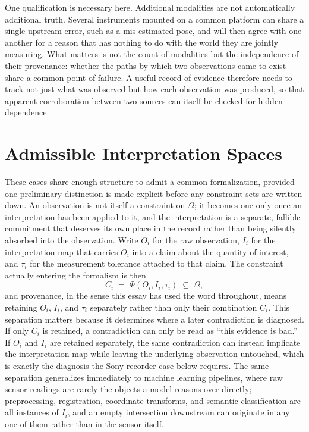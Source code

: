 \documentclass[11pt]{article}
\begin{document}
One qualification is necessary here. Additional modalities are not automatically additional truth. Several instruments mounted on a common platform can share a single upstream error, such as a mis-estimated pose, and will then agree with one another for a reason that has nothing to do with the world they are jointly measuring. What matters is not the count of modalities but the independence of their provenance: whether the paths by which two observations came to exist share a common point of failure. A useful record of evidence therefore needs to track not just what was observed but how each observation was produced, so that apparent corroboration between two sources can itself be checked for hidden dependence.

\section{Admissible Interpretation Spaces}

These cases share enough structure to admit a common formalization, provided one preliminary distinction is made explicit before any constraint sets are written down. An observation is not itself a constraint on $\Omega$; it becomes one only once an interpretation has been applied to it, and the interpretation is a separate, fallible commitment that deserves its own place in the record rather than being silently absorbed into the observation. Write $O_i$ for the raw observation, $I_i$ for the interpretation map that carries $O_i$ into a claim about the quantity of interest, and $\tau_i$ for the measurement tolerance attached to that claim. The constraint actually entering the formalism is then
\[
C_i \;=\; \Phi(O_i, I_i, \tau_i) \;\subseteq\; \Omega,
\]
and provenance, in the sense this essay has used the word throughout, means retaining $O_i$, $I_i$, and $\tau_i$ separately rather than only their combination $C_i$. This separation matters because it determines where a later contradiction is diagnosed. If only $C_i$ is retained, a contradiction can only be read as ``this evidence is bad.'' If $O_i$ and $I_i$ are retained separately, the same contradiction can instead implicate the interpretation map while leaving the underlying observation untouched, which is exactly the diagnosis the Sony recorder case below requires. The same separation generalizes immediately to machine learning pipelines, where raw sensor readings are rarely the objects a model reasons over directly; preprocessing, registration, coordinate transforms, and semantic classification are all instances of $I_i$, and an empty intersection downstream can originate in any one of them rather than in the sensor itself.
\end{document}
